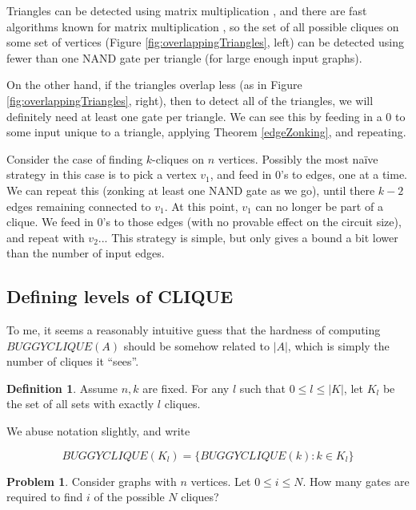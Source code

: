 \documentclass[12pt]{article}
\theoremstyle{definition}
\newtheorem{defn}{Definition}[section]
\newtheorem{prob}{Problem}[section]
\begin{document}
Triangles can be detected using matrix multiplication \cite{itai_finding_1977},
and there are fast algorithms known for matrix multiplication
\cite{strassen_gaussian_1969}
\cite{williams_multiplying_2012}, so the set of all possible
cliques on some set of vertices (Figure \ref{fig:overlappingTriangles}, left)
 can be detected
using fewer than one NAND gate per triangle (for large enough input graphs).

On the other hand, if the triangles overlap less (as in
Figure \ref{fig:overlappingTriangles}, right),
then to detect all of the triangles, we will definitely need at least one
gate per triangle. We can see this by feeding in a 0 to some input
unique to a triangle, applying Theorem \ref{edgeZonking}, and repeating.

Consider the case of finding $k$-cliques on $n$ vertices.
Possibly the most na\"ive strategy in this case is to pick a vertex $v_1$,
and feed in 0's to edges, one at a time. We can repeat this
(zonking at least one NAND gate as we go), until there
$k-2$ edges remaining connected to $v_1$. At this point, $v_1$ can no
longer be part of a clique. We feed in 0's to those edges (with no
provable effect on the circuit size), and repeat with $v_2$...
This strategy is simple, but only gives a bound a bit lower than
the number of input edges.

\subsection{Defining levels of CLIQUE}

To me, it seems a reasonably intuitive guess that the hardness of
computing $BUGGYCLIQUE(A)$ should be somehow related to
$|A|$, which is simply the number of cliques it ``sees''.

\begin{defn}
\label{CLIQUE-level}
Assume $n, k$ are fixed. For any $l$ such that
$0 \le l \le |K|$, let $K_l$ be the set of all sets
with exactly $l$ cliques. 
\end{defn}

We abuse notation slightly, and write

\[
BUGGYCLIQUE(K_l) = \{ BUGGYCLIQUE(k) : k \in K_l \}
\]

\begin{prob}
\label{gatesPerLevel}
Consider graphs with $n$ vertices.
Let $0 \le i \le N$.
How many gates are required to find $i$ of the possible $N$
cliques?

\end{prob}
\end{document}
